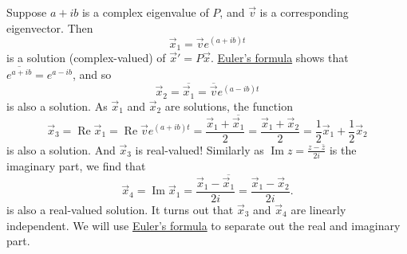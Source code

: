 Suppose $a + ib$ is a complex eigenvalue of $P$, and $\vec{v}$
is a corresponding eigenvector.  Then
\begin{equation*}
\vec{x}_1 = \vec{v} e^{(a+ib)t}
\end{equation*}
is a solution (complex-valued) of
${\vec{x}}' = P \vec{x}$.  \hyperref[eulersformula]{Euler's formula}
shows that $\overline{e^{a+ib}} =
e^{a-ib}$,
and so
\begin{equation*}
\vec{x}_2 = \overline{\vec{x}_1} = \overline{\vec{v}} e^{(a-ib)t}
\end{equation*}
is also a solution.
As $\vec{x}_1$ and $\vec{x}_2$ are solutions, the function
\begin{equation*}
\vec{x}_3 =
\operatorname{Re} \vec{x}_1 =
\operatorname{Re} \vec{v} e^{(a+ib)t} =
\frac{\vec{x}_1 + \overline{\vec{x}_1}}{2}  =
\frac{\vec{x}_1 + \vec{x}_2}{2} 
=
\frac{1}{2} \vec{x}_1 + \frac{1}{2}\vec{x}_2
\end{equation*}
is also a solution.  And $\vec{x}_3$ is real-valued!  Similarly as
$\operatorname{Im} z = \frac{z-\bar{z}}{2i}$ is the imaginary part, we find
that
\begin{equation*}
\vec{x}_4 =
\operatorname{Im} \vec{x}_1 =
\frac{\vec{x}_1 - \overline{\vec{x}_1}}{2i}  =
\frac{\vec{x}_1 - \vec{x}_2}{2i} .
\end{equation*}
is also a real-valued solution.  It turns out that $\vec{x}_3$ and
$\vec{x}_4$ are linearly independent.
We will use \hyperref[eulersformula]{Euler's formula}
to separate out the real and imaginary part.

\medskip

